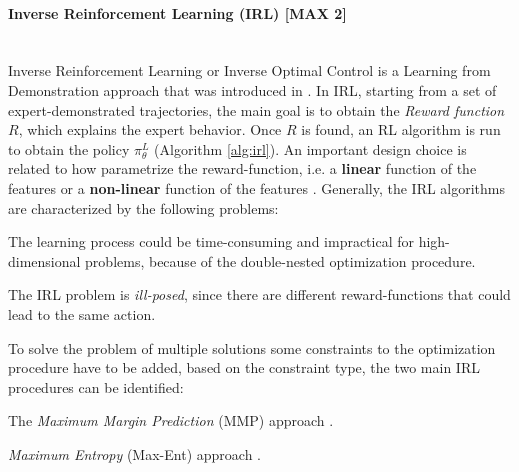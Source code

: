 \newpage
\paragraph{Inverse Reinforcement Learning (IRL) [MAX 2]}  \mbox{} \\
Inverse Reinforcement Learning or Inverse Optimal Control is a Learning from Demonstration approach that was introduced in \cite{abbeel2004apprenticeship}. In IRL, starting from a set of expert-demonstrated trajectories, the main goal is to obtain the \textit{Reward function} $R$, which explains the expert behavior. Once $R$ is found, an RL algorithm is run to obtain the policy $\pi^{L}_{\theta}$ (Algorithm \ref{alg:irl}). %
An important design choice is related to how parametrize the reward-function, i.e. a \textbf{linear} function of the features \cite{ratliff2006maximum_margin,ziebart2008maximum_entropy} or  a \textbf{non-linear} function of the features \cite{ratliff2009learning_to_search,wulfmeier2015deep_inverse_rl,finn2016guided_cost_learning}.
Generally, the IRL algorithms are characterized by the following problems: \begin{enumerate*}[label=\textbf{(\arabic*)}]
    \item The learning process could be time-consuming and impractical for high-dimensional problems, because of the double-nested optimization procedure.  
    \item The IRL problem is \textit{ill-posed}, since there are different reward-functions that could lead to the same action.
\end{enumerate*}
%
\newline To solve the problem of multiple solutions some constraints to the optimization procedure have to be added, based on the constraint type, the two main IRL procedures can be identified: \begin{enumerate*}[label=\textbf{(\alph*)}]
    \item The \textit{Maximum Margin Prediction} (MMP) approach \cite{ratliff2006maximum_margin,ratliff2009learning_to_search}.  
    \item \textit{Maximum Entropy} (Max-Ent) approach \cite{ziebart2008maximum_entropy,wulfmeier2015deep_inverse_rl,finn2016guided_cost_learning}.
\end{enumerate*}
